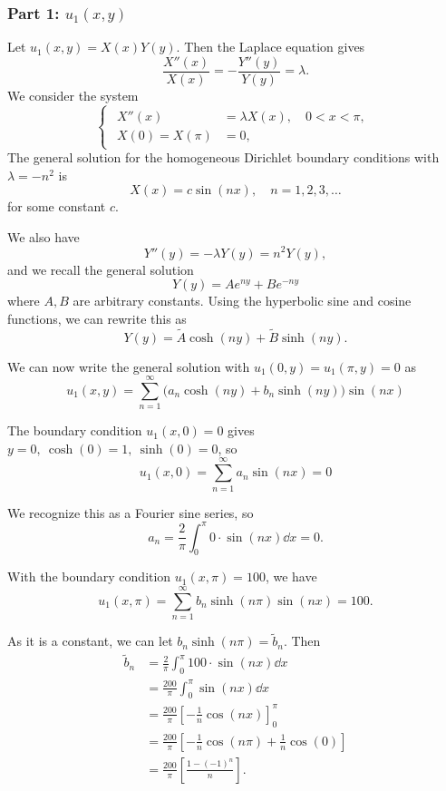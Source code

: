\documentclass[plain]{pset}
\begin{document}
\begin{solution}
    \subsubsection*{Part 1: \(u_1(x, y)\)}
    Let \(u_1(x, y) = X(x)Y(y)\). Then the Laplace equation gives
    \[\frac{X''(x)}{X(x)} = -\frac{Y''(y)}{Y(y)} = \lambda.\]
    We consider the system
    \[
        \begin{cases}
            \begin{aligned}
                X''(x)        & = \lambda X(x), \quad 0 < x < \pi, \\
                X(0) = X(\pi) & = 0,
            \end{aligned}
        \end{cases}
    \]
    The general solution for the homogeneous Dirichlet boundary conditions with \(\lambda = -n^2\) is
    \[X(x) = c\sin(nx), \quad n = 1, 2, 3, \ldots\]
    for some constant \(c\).

    We also have
    \[Y''(y) = -\lambda Y(y) = n^2 Y(y),\]
    and we recall the general solution
    \[Y(y) = Ae^{ny} + Be^{-ny}\]
    where \(A, B\) are arbitrary constants. Using the hyperbolic sine and cosine functions, we can rewrite this as
    \[Y(y) = \tilde{A}\cosh(ny) + \tilde{B}\sinh(ny).\]

    We can now write the general solution with \(u_1(0, y) = u_1(\pi, y) = 0\) as
    \[u_1(x, y) = \sum_{n=1}^\infty \bigl(a_n \cosh(ny) + b_n \sinh(ny)\bigr)\sin(nx)\]

    The boundary condition \(u_1(x, 0) = 0\) gives \(y = 0, \ \cosh(0) = 1, \ \sinh(0) = 0\), so
    \[u_1(x, 0) = \sum_{n=1}^\infty a_n \sin(nx) = 0\]

    We recognize this as a Fourier sine series, so
    \[a_n = \frac{2}{\pi} \int_0^\pi 0 \cdot \sin(nx) \dd x = 0.\]

    With the boundary condition \(u_1(x, \pi) = 100\), we have
    \[u_1(x, \pi) = \sum_{n=1}^\infty b_n \sinh(n\pi)\sin(nx) = 100.\]

    As it is a constant, we can let \(b_n \sinh(n\pi) = \tilde{b}_n\). Then
    \begin{align*}
        \tilde{b}_n & = \frac{2}{\pi} \int_0^\pi 100 \cdot \sin(nx) \dd x                                                                                                              \\
                    & = \frac{200}{\pi} \int_0^\pi \sin(nx) \dd x                                                                                                                        \\
                    & = \frac{200}{\pi} \left[-\frac{1}{n}\cos(nx)\right]_0^\pi                                                                                                         \\
                    & = \frac{200}{\pi} \left[-\frac{1}{n}\cos(n\pi) + \frac{1}{n}\cos(0)\right]                                                                                         \\
                    & = \frac{200}{\pi} \left[\frac{1 - (-1)^n}{n}\right].
    \end{align*}


\end{solution}
\end{document}
